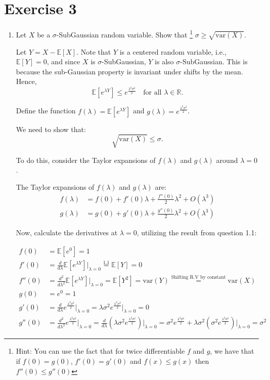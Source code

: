 \documentclass[a4 paper]{article}
\theoremstyle{boldStyle}
\theoremstyle{boldBlueStyle}
\theoremstyle{boldPurpleStyle}
\theoremstyle{boldRedStyle}
\begin{document}
\section*{Exercise 3}
\begin{enumerate}
\item \textcolor{blueColor}{Let \(X\) be a \(\sigma\)-SubGaussian random variable. Show that
\footnote{Hint: You can use the fact that for twice differentiable \( f \) and \( g \), we have that if \( f(0) = g(0) \), \( f'(0) = g'(0) \) and \( f(x) \leq g(x) \) then \( f''(0) \leq g''(0) \)}
\(\sigma \geq \sqrt{\mathrm{var}(X)}\).}

\bigbreak


Let \(Y = X - \mathbb{E}[X]\). Note that \(Y\) is a centered random variable, i.e., \(\mathbb{E}[Y] = 0\), and since \(X\) is \(\sigma\)-SubGaussian, \(Y\) is also \(\sigma\)-SubGaussian. This is because the sub-Gaussian property is invariant under shifts by the mean. Hence,
\[
\mathbb{E}\left[e^{\lambda Y}\right] \leq e^{\frac{\lambda^2 \sigma^2}{2}} \quad \text{for all } \lambda \in \mathbb{R}.
\]

Define the function \(f(\lambda) = \mathbb{E}[e^{\lambda Y}]\) and \(g(\lambda) = e^{\frac{\lambda^2 \sigma^2}{2}}\). 

We need to show that:
\[
\sqrt{\mathrm{var}(X)} \leq \sigma.
\]

To do this, consider the Taylor expansions of \(f(\lambda)\) and \(g(\lambda)\) around \(\lambda = 0\).

The Taylor expansions of \(f(\lambda)\) and \(g(\lambda)\) are:
\begin{align*}
f(\lambda) &= f(0) + f'(0) \lambda + \frac{f''(0)}{2} \lambda^2 + O(\lambda^3) \\
g(\lambda) &= g(0) + g'(0) \lambda + \frac{g''(0)}{2} \lambda^2 + O(\lambda^3)
\end{align*}

Now, calculate the derivatives at \(\lambda = 0\), utilizing the result from question 1.1:

\begin{align*}
f(0) &= \mathbb{E}[e^{0}] = 1 \\
f'(0) &= \frac{d}{d\lambda} \mathbb{E}[e^{\lambda Y}] \bigg|_{\lambda=0} \stackrel{\text{1.1}}{=} \mathbb{E}[Y] = 0 \\
f''(0) &= \frac{d^2}{d\lambda^2} \mathbb{E}[e^{\lambda Y}] \bigg|_{\lambda=0} = \mathbb{E}[Y^2] = \mathrm{var}(Y)  \stackrel{\text{Shifting R.V by constant}}{=} \mathrm{var}(X) \\
g(0) &= e^{0} = 1 \\
g'(0) &= \frac{d}{d\lambda} e^{\frac{\lambda^2 \sigma^2}{2}} \bigg|_{\lambda=0} = \lambda \sigma^2 e^{\frac{\lambda^2 \sigma^2}{2}} \bigg|_{\lambda=0} = 0 \\
g''(0) &= \frac{d^2}{d\lambda^2} e^{\frac{\lambda^2 \sigma^2}{2}} \bigg|_{\lambda=0} = \frac{d}{d\lambda} \left( \lambda \sigma^2 e^{\frac{\lambda^2 \sigma^2}{2}} \right) \bigg|_{\lambda=0} = \sigma^2 e^{\frac{\lambda^2 \sigma^2}{2}} + \lambda \sigma^2 \left( \sigma^2 e^{\frac{\lambda^2 \sigma^2}{2}} \right) \bigg|_{\lambda=0} = \sigma^2
\end{align*}


\end{enumerate}
\end{document}
